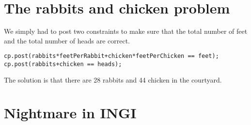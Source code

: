 \documentclass{eplDoc}
\begin{document}
\maketitle
\newpage

\section{The rabbits and chicken problem}

We simply had to post two constraints to make sure that the total number of feet and the total number of heads are correct. 

\begin{lstlisting}
cp.post(rabbits*feetPerRabbit+chicken*feetPerChicken == feet);
cp.post(rabbits+chicken == heads);
\end{lstlisting}

The solution is that there are 28 rabbits and 44 chicken in the courtyard. 


\section{Nightmare in INGI}
\end{document}
